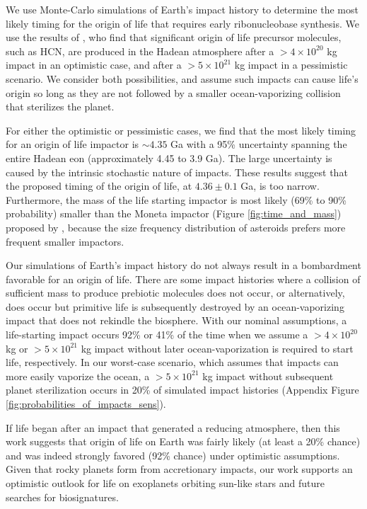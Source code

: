 \documentclass[manuscript]{aastex63}
\begin{document}
We use Monte-Carlo simulations of Earth's impact history to determine the most likely timing for the origin of life that requires early ribonucleobase synthesis. We use the results of \citet{Wogan_2023}, who find that significant origin of life precursor molecules, such as HCN, are produced in the Hadean atmosphere after a $> 4 \times 10^{20}$ kg impact in an optimistic case, and after a $> 5 \times 10^{21}$ kg impact in a pessimistic scenario. We consider both possibilities, and assume such impacts can cause life's origin so long as they are not followed by a smaller ocean-vaporizing collision that sterilizes the planet.

For either the optimistic or pessimistic cases, we find that the most likely timing for an origin of life impactor is $\sim 4.35$ Ga with a 95\% uncertainty spanning the entire Hadean eon (approximately 4.45 to 3.9 Ga). The large uncertainty is caused by the intrinsic stochastic nature of impacts. These results suggest that the \citet{Benner_2020} proposed timing of the origin of life, at $4.36 \pm 0.1$ Ga, is too narrow. Furthermore, the mass of the life starting impactor is most likely (69\% to 90\% probability) smaller than the Moneta impactor (Figure \ref{fig:time_and_mass}) proposed by \citet{Benner_2020}, because the size frequency distribution of asteroids prefers more frequent smaller impactors.

Our simulations of Earth's impact history do not always result in a bombardment favorable for an origin of life. There are some impact histories where a collision of sufficient mass to produce prebiotic molecules does not occur, or alternatively, does occur but primitive life is subsequently destroyed by an ocean-vaporizing impact that does not rekindle the biosphere. With our nominal assumptions, a life-starting impact occurs 92\% or 41\% of the time when we assume a $> 4 \times 10^{20}$ kg or $> 5 \times 10^{21}$ kg impact without later ocean-vaporization is required to start life, respectively. In our worst-case scenario, which assumes that impacts can more easily vaporize the ocean, a $> 5 \times 10^{21}$ kg impact without subsequent planet sterilization occurs in 20\% of simulated impact histories (Appendix Figure \ref{fig:probabilities_of_impacts_sens}).

If life began after an impact that generated a reducing atmosphere, then this work suggests that origin of life on Earth was fairly likely (at least a 20\% chance) and was indeed strongly favored (92\% chance) under optimistic assumptions. Given that rocky planets form from accretionary impacts, our work supports an optimistic outlook for life on exoplanets orbiting sun-like stars and future searches for biosignatures. 
\end{document}
